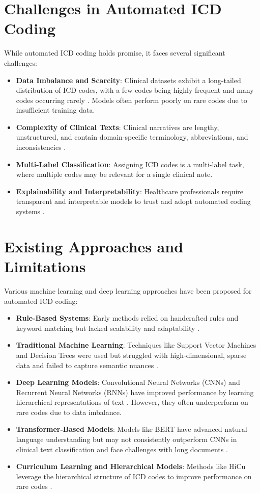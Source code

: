 \documentclass[12pt,a4paper]{report}
\begin{document}
\section{Challenges in Automated ICD Coding}
While automated ICD coding holds promise, it faces several significant challenges:
\begin{itemize}
    \item \textbf{Data Imbalance and Scarcity}: Clinical datasets exhibit a long-tailed distribution of ICD codes, with a few codes being highly frequent and many codes occurring rarely \cite{rios2018few}. Models often perform poorly on rare codes due to insufficient training data.
    \item \textbf{Complexity of Clinical Texts}: Clinical narratives are lengthy, unstructured, and contain domain-specific terminology, abbreviations, and inconsistencies \cite{wrenn2010quantifying}.
    \item \textbf{Multi-Label Classification}: Assigning ICD codes is a multi-label task, where multiple codes may be relevant for a single clinical note.
    \item \textbf{Explainability and Interpretability}: Healthcare professionals require transparent and interpretable models to trust and adopt automated coding systems \cite{holzinger2017we}.
\end{itemize}

\section{Existing Approaches and Limitations}
Various machine learning and deep learning approaches have been proposed for automated ICD coding:
\begin{itemize}
    \item \textbf{Rule-Based Systems}: Early methods relied on handcrafted rules and keyword matching but lacked scalability and adaptability \cite{farkas2008automatic}.
    \item \textbf{Traditional Machine Learning}: Techniques like Support Vector Machines and Decision Trees were used but struggled with high-dimensional, sparse data and failed to capture semantic nuances \cite{perotte2014diagnosis}.
    \item \textbf{Deep Learning Models}: Convolutional Neural Networks (CNNs) and Recurrent Neural Networks (RNNs) have improved performance by learning hierarchical representations of text \cite{mullenbach2018explainable, vu2020label}. However, they often underperform on rare codes due to data imbalance.
    \item \textbf{Transformer-Based Models}: Models like BERT have advanced natural language understanding but may not consistently outperform CNNs in clinical text classification and face challenges with long documents \cite{dong2022automated, gao2021limitations}.
    \item \textbf{Curriculum Learning and Hierarchical Models}: Methods like HiCu leverage the hierarchical structure of ICD codes to improve performance on rare codes \cite{ren2022hicu}.
\end{itemize}
\end{document}
